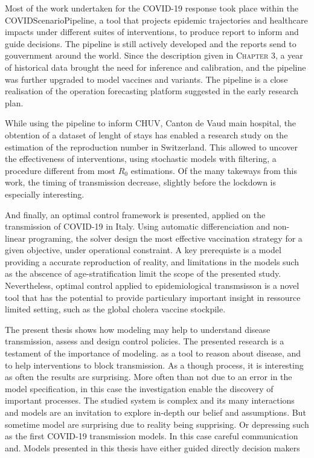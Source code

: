 Most of the work undertaken for the COVID-19 response took place within the COVIDScenarioPipeline, a tool that projects epidemic trajectories and healthcare impacts under different suites of interventions, to produce report to inform and guide decisions. The pipeline is still actively developed and the reports send to gouvernment around the world. Since the description given in \textsc{Chapter 3}, a year of historical data brought the need for inference and calibration, and the pipeline was further upgraded to model vaccines and variants. The pipeline is a close realisation of the operation forecasting platform suggested in the early research plan.

While using the pipeline to inform CHUV, Canton de Vaud main hospital, the obtention of a dataset of lenght of stays has enabled a research study on the estimation of the reproduction number in Switzerland. This allowed to uncover the effectiveness of interventions, using stochastic models with filtering, a procedure different from most $R_0$ estimations. Of the many takeways from this work, the timing of transmission decrease, slightly before the lockdown is especially interesting.

And finally, an optimal control framework is presented, applied on the transmission of COVID-19 in Italy. Using automatic differenciation and non-linear programing, the solver design the most effective vaccination strategy for a given objective, under operational constraint. A key prerequiste is a model providing a accurate reproduction of reality, and limitations in the models such as the abscence of age-stratification limit the scope of the presented study. Nevertheless, optimal control applied to epidemiological transmsisson is a novel tool that has the potential to provide particulary important  insight in ressource limited setting, such as the global cholera vaccine stockpile.

The present thesis shows how modeling may help to understand disease transmission, assess and design control policies.
 The presented research is a testament of the importance of modeling. as a tool to reason about disease, and to help interventions to block transmission. As a though process, it is interesting as often the results are surprising. More often than not due to an error in the model specification, in this case the investigation enable the discovery of important processes. The studied system is complex and its many interactions and models are an invitation to explore in-depth our belief and assumptions. But sometime model are surprising due to reality being supprising. Or depressing such as the first COVID-19 transmission models. In this case careful communication and. Models presented in this thesis have either guided directly decision makers
 
